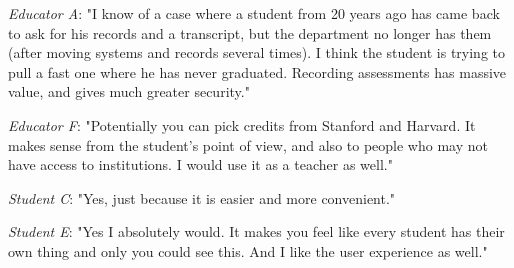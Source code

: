 \textit{Educator A}: "I know of a case where a student from 20 years ago has came back to ask for his records
and a transcript, but the department no longer has them (after moving systems and records several times).
I think the student is trying to pull a fast one where he has never graduated. Recording assessments has massive value,
and gives much greater security."

\textit{Educator F}: "Potentially you can pick credits from Stanford and Harvard.
It makes sense from the student's point of view, and also to people who may not have access to institutions.
I would use it as a teacher as well."

\textit{Student C}: "Yes, just because it is easier and more convenient."

\textit{Student E}: "Yes I absolutely would. It makes you feel like every student has their own thing and 
only you could see this. And I like the user experience as well."
